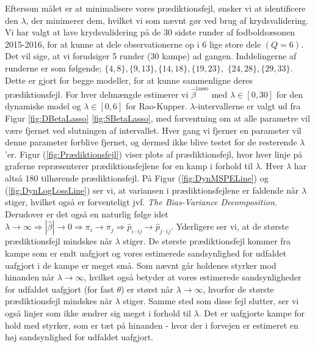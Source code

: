 \documentclass[11pt,a4paper]{article}
\begin{document}
\par  Eftersom målet er at minimalisere vores prædiktionsfejl, ønsker vi at identificere den $\lambda$, der minimerer dem, hvilket vi som nævnt gør ved brug af krydsvalidering. Vi har valgt at lave krydsvalidering på de 30 sidste runder af fodboldsæsonen 2015-2016, for at kunne at dele observationerne op i 6 lige store dele $(Q=6)$. Det vil sige, at vi forudsiger 5 runder (30 kampe) ad gangen. Inddelingerne af runderne er som følgende; $\{4,8\},\{9,13\},\{14,18\},\{19,23\},$ $\{24,28\},\{29,33\}$. Dette er gjort for begge modeller, for at kunne sammenligne deres prædiktionsfejl. For hver delmængde estimerer vi $\hat{\beta}^{\text{lasso}}$ med $\lambda \in [0,30]$ for den dynamiske model og $\lambda \in [0,6]$ for Rao-Kupper. $\lambda$-intervallerne er valgt ud fra Figur \ref{fig:DBetaLasso} \ref{fig:SBetaLasso}, med forventning om at alle parametre vil være fjernet ved slutningen af intervallet. Hver gang vi fjerner en parameter vil denne parameter forblive fjernet, og dermed ikke blive testet for de resterende $\lambda$'er. Figur (\ref{fig:Prædiktionsfejl}) viser plots af prædiktionsfejl, hvor hver linje på graferne repræsenterer prædiktionsfejlene for en kamp i forhold til $\lambda$. Hver $\lambda$ har altså 180 tilhørende prædiktionsfejl. På Figur (\ref{fig:DynMSPELine}) og (\ref{fig:DynLogLossLine}) ser vi, at variansen i prædiktionsfejlene er faldende når $\lambda$ stiger, hvilket også er forventeligt jvf. \textit{The Bias-Variance Decomposition}. Derudover er det også en naturlig følge idet $\lambda \rightarrow \infty \Rightarrow |\hat{\beta}| \rightarrow 0 \Rightarrow \pi_i \rightarrow \pi_j \Rightarrow \hat{p}_{i\cdot ij} \rightarrow \hat{p}_{j \cdot ij}$. Yderligere ser vi, at de største prædiktionsfejl mindskes når $\lambda$ stiger. De største prædiktionsfejl kommer fra kampe som er endt uafgjort og vores estimerede sandsynlighed for udfaldet uafgjort i de kampe er meget små. Som nævnt går holdenes styrker mod hinanden når $\lambda \rightarrow \infty$, hvilket også betyder at vores estimerede sandsynligheder for udfaldet uafgjort (for fast $\theta$) er størst når $\lambda \rightarrow \infty$, hvorfor de største prædiktionsfejl mindskes når $\lambda$ stiger. Samme sted som disse fejl slutter, ser vi også linjer som ikke ændrer sig meget i forhold til $\lambda$. Det er uafgjorte kampe for hold med styrker, som er tæt på hinanden - hvor der i forvejen er estimeret en høj sandsynlighed for udfaldet uafgjort.\par
\end{document}
